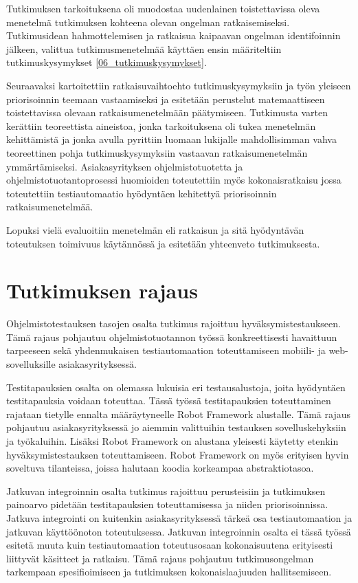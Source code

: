 Tutkimuksen tarkoituksena oli muodostaa uudenlainen toistettavissa oleva menetelmä tutkimuksen kohteena olevan ongelman ratkaisemiseksi.
Tutkimusidean hahmottelemisen ja ratkaisua kaipaavan ongelman identifoinnin jälkeen, valittua tutkimusmenetelmää käyttäen ensin määriteltiin tutkimuskysymykset \ref{06_tutkimuskysymykset}.

Seuraavaksi kartoitettiin ratkaisuvaihtoehto tutkimuskysymyksiin ja työn yleiseen priorisoinnin teemaan vastaamiseksi ja esitetään perustelut matemaattiseen toistettavissa olevaan ratkaisumenetelmään päätymiseen.
Tutkimusta varten kerättiin teoreettista aineistoa, jonka tarkoituksena oli tukea menetelmän kehittämistä ja jonka avulla pyrittiin luomaan lukijalle mahdollisimman vahva teoreettinen pohja tutkimuskysymyksiin vastaavan ratkaisumenetelmän ymmärtämiseksi.
Asiakasyrityksen ohjelmistotuotetta ja ohjelmistotuotantoprosessi huomioiden toteutettiin myös kokonaisratkaisu jossa toteutettiin testiautomaatio hyödyntäen kehitettyä priorisoinnin ratkaisumenetelmää.

Lopuksi vielä evaluoitiin menetelmän eli ratkaisun ja sitä hyödyntävän toteutuksen toimivuus käytännössä ja esitetään yhteenveto tutkimuksesta.

\section{Tutkimuksen rajaus} \label{06_tutkimuksen_rajaus}

Ohjelmistotestauksen tasojen osalta tutkimus rajoittuu hyväksymistestaukseen.
Tämä rajaus pohjautuu ohjelmistotuotannon työssä konkreettisesti havaittuun tarpeeseen sekä yhdenmukaisen testiautomaation toteuttamiseen mobiili- ja web-sovelluksille asiakasyrityksessä.

Testitapauksien osalta on olemassa lukuisia eri testausalustoja, joita hyödyntäen testitapauksia voidaan toteuttaa.
Tässä työssä testitapauksien toteuttaminen rajataan tietylle ennalta määräytyneelle Robot Framework alustalle.
Tämä rajaus pohjautuu asiakasyrityksessä jo aiemmin valittuihin testauksen sovelluskehyksiin ja työkaluihin.
Lisäksi Robot Framework on alustana yleisesti käytetty etenkin hyväksymistestauksen toteuttamiseen.
Robot Framework on myös erityisen hyvin soveltuva tilanteissa, joissa halutaan koodia korkeampaa abstraktiotasoa.

Jatkuvan integroinnin osalta tutkimus rajoittuu perusteisiin ja tutkimuksen painoarvo pidetään testitapauksien toteuttamisessa ja niiden priorisoinnissa.
Jatkuva integrointi on kuitenkin asiakasyrityksessä tärkeä osa testiautomaation ja jatkuvan käyttöönoton toteutuksessa.
Jatkuvan integroinnin osalta ei tässä työssä esitetä muuta kuin testiautomaation toteutusosaan kokonaisuutena erityisesti liittyvät käsitteet ja ratkaisu.
Tämä rajaus pohjautuu tutkimusongelman tarkempaan spesifioimiseen ja tutkimuksen kokonaislaajuuden hallitsemiseen.

